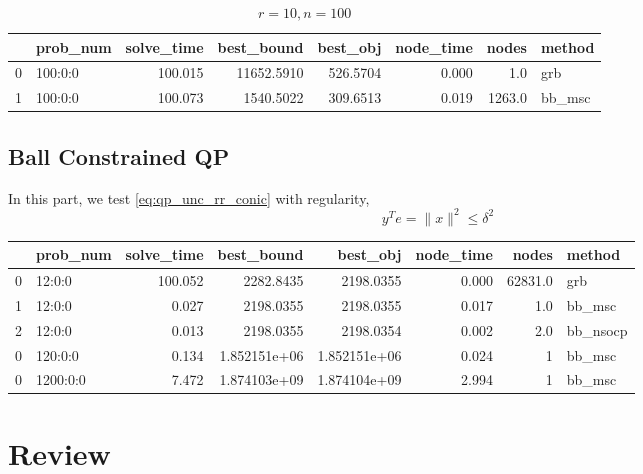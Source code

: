 \documentclass[a4paper, 10pt]{article}
\begin{document}
\begin{table}[h!]
    \begin{tabular}{llrrrrrl}
        \toprule
        {} & prob\_num & solve\_time & best\_bound & best\_obj & node\_time & nodes  & method  \\
        \midrule
        0  & 100:0:0   & 100.015     & 11652.5910  & 526.5704  & 0.000      & 1.0    & grb     \\
        1  & 100:0:0   & 100.073     & 1540.5022   & 309.6513  & 0.019      & 1263.0 & bb\_msc \\
        \bottomrule
    \end{tabular}
    \caption{\(r=10, n=100\)}
\end{table}
\normalsize

\subsection{Ball Constrained QP}
In this part, we test \eqref{eq:qp_unc_rr_conic} with regularity,
\begin{equation}
    y^Te = \|x\|^2 \le \delta^2
\end{equation}
\scriptsize
\begin{table}[h!]
    \begin{tabular}{llrrrrrl}
        \toprule
        {} & prob\_num & solve\_time & best\_bound  & best\_obj    & node\_time & nodes   & method    \\
        \midrule
        0  & 12:0:0    & 100.052     & 2282.8435    & 2198.0355    & 0.000      & 62831.0 & grb       \\
        1  & 12:0:0    & 0.027       & 2198.0355    & 2198.0355    & 0.017      & 1.0     & bb\_msc   \\
        2  & 12:0:0    & 0.013       & 2198.0355    & 2198.0354    & 0.002      & 2.0     & bb\_nsocp \\
        \midrule
        0  & 120:0:0   & 0.134       & 1.852151e+06 & 1.852151e+06 & 0.024      & 1       & bb\_msc   \\
        \midrule
        0  & 1200:0:0  & 7.472       & 1.874103e+09 & 1.874104e+09 & 2.994      & 1       & bb\_msc   \\
        \bottomrule
    \end{tabular}
\end{table}
\normalsize
\section{Review}
\end{document}
